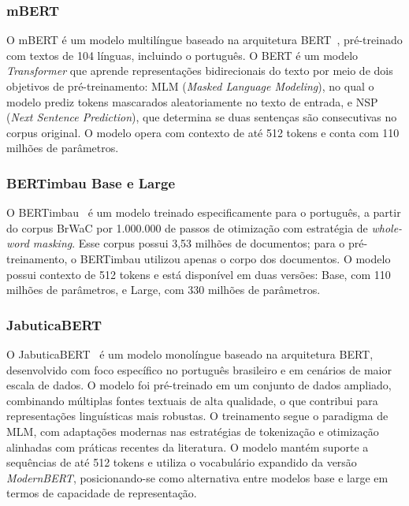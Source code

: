 \subsubsection*{mBERT}

O mBERT é um modelo multilíngue baseado na arquitetura BERT~\citep{devlin2019bert},
pré-treinado com textos de 104 línguas, incluindo o português. O BERT é um modelo
\textit{Transformer} que aprende representações bidirecionais do texto por meio de dois
objetivos de pré-treinamento: MLM (\textit{Masked Language Modeling}), no qual o modelo
prediz tokens mascarados aleatoriamente no texto de entrada, e NSP (\textit{Next Sentence
Prediction}), que determina se duas sentenças são consecutivas no corpus original. O modelo
opera com contexto de até 512 tokens e conta com 110 milhões de parâmetros.

\subsubsection*{BERTimbau Base e Large}

O BERTimbau~\citep{souza2020bertimbau} é um modelo treinado especificamente para o português,
a partir do corpus BrWaC por 1.000.000 de passos de otimização com estratégia de
\textit{whole-word masking}. Esse corpus possui 3,53 milhões de documentos; para o
pré-treinamento, o BERTimbau utilizou apenas o corpo dos documentos. O modelo possui contexto
de 512 tokens e está disponível em duas versões: Base, com 110 milhões de parâmetros, e Large,
com 330 milhões de parâmetros.

\subsubsection*{JabuticaBERT}

O JabuticaBERT~\citep{thiago} é um modelo monolíngue baseado na arquitetura BERT, desenvolvido
com foco específico no português brasileiro e em cenários de maior escala de dados. O modelo
foi pré-treinado em um conjunto de dados ampliado, combinando múltiplas fontes textuais de alta
qualidade, o que contribui para representações linguísticas mais robustas. O treinamento segue
o paradigma de MLM, com adaptações modernas nas estratégias de tokenização e otimização
alinhadas com práticas recentes da literatura. O modelo mantém suporte a sequências de até 512
tokens e utiliza o vocabulário expandido da versão \textit{ModernBERT}, posicionando-se como
alternativa entre modelos base e large em termos de capacidade de representação.


